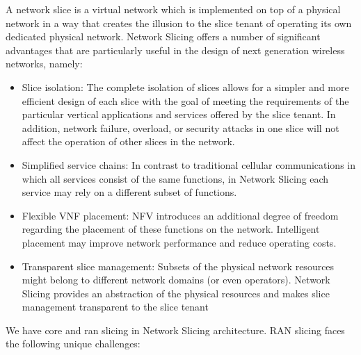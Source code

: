 \documentclass{article}
\begin{document}
A network slice is a virtual network which is implemented on top
of a physical network in a way that creates the illusion to the
slice tenant of operating its own dedicated physical network.
Network Slicing offers a number of significant advantages
that are particularly useful in the design of next generation
wireless networks, namely:
\begin{itemize}
\item  Slice isolation: The complete isolation of slices allows
for a simpler and more efficient design of each slice with
the goal of meeting the requirements of the particular
vertical applications and services offered by the slice
tenant. In addition, network failure, overload, or security
attacks in one slice will not affect the operation of other
slices in the network.
\item Simplified service chains: In contrast to traditional cellular communications in which all services consist of the
same functions, in Network Slicing each service may rely
on a different subset of functions.
\item Flexible VNF placement: NFV introduces an additional
degree of freedom regarding the placement of these functions on the network. Intelligent placement may improve
network performance and reduce operating costs.
\item Transparent slice management: Subsets of the physical
network resources might belong to different network
domains (or even operators). Network Slicing provides
an abstraction of the physical resources and makes slice
management transparent to the slice tenant
\end{itemize}
We have core and ran slicing in Network Slicing architecture.
RAN slicing faces the following unique challenges: 
\end{document}
